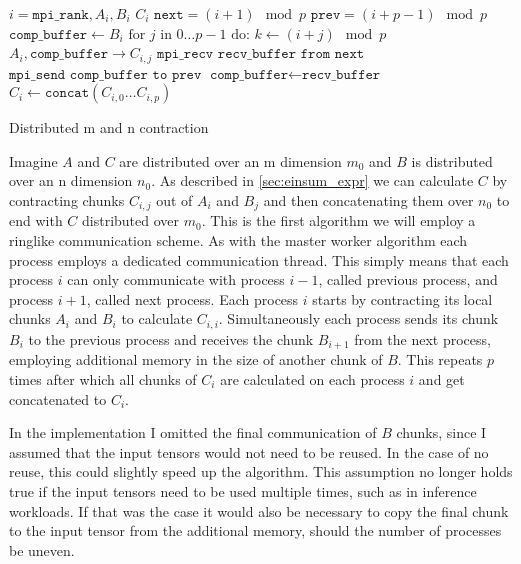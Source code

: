 \begin{algorithm}[ht]
        \begin{algorithmic}
        \Require $i = \texttt{mpi\_rank}, A_i, B_i$
        \Ensure $C_i$
        \State $\texttt{next} = (i+1) \mod p$
        \State $\texttt{prev} = (i+p-1) \mod p$
        \State $\texttt{comp\_buffer} \gets B_i$
        \State  $\text{for } j \text{ in } 0\dots p - 1 \text{ do:}$
        \State \indent $k \gets (i + j) \mod p$
        \State \indent {}
        \State \indent \indent $A_i, \texttt{comp\_buffer} \rightarrow C_{i,j}$
        \State \indent \indent $\texttt{mpi\_recv recv\_buffer from next}$
        \State \indent \indent $\texttt{mpi\_send comp\_buffer to prev}$
        \State \indent $\texttt{comp\_buffer} \gets \texttt{recv\_buffer}$
        \State $C_i \gets \texttt{concat}(C_{i,0}\dots C_{i,p})$
    \end{algorithmic}
    \caption{Distributed m and n contraction}
    \label{alg:m_n_pseudocode}
\end{algorithm}

Imagine $A$ and $C$ are distributed over an m dimension $m_0$ and $B$ is distributed over an n dimension $n_0$.
As described in \ref{sec:einsum_expr} we can calculate $C$ by contracting chunks $C_{i,j}$ out of $A_i$ and $B_j$ and then concatenating them over $n_0$ to end with $C$ distributed over $m_0$.
This is the first algorithm we will employ a ringlike communication scheme.
As with the master worker algorithm each process employs a dedicated communication thread.
This simply means that each process $i$ can only communicate with process $i-1$, called previous process, and process $i+1$, called next process.
Each process $i$ starts by contracting its local chunks $A_i$ and $B_i$ to calculate $C_{i,i}$.
Simultaneously each process sends its chunk $B_i$ to the previous process and receives the chunk $B_{i+1}$ from the next process, employing additional memory in the size of another chunk of $B$.
This repeats $p$ times after which all chunks of $C_{i}$ are calculated on each process $i$ and get concatenated to $C_i$.

In the implementation I omitted the final communication of $B$ chunks, since I assumed that the input tensors would not need to be reused.
In the case of no reuse, this could slightly speed up the algorithm.
This assumption no longer holds true if the input tensors need to be used multiple times, such as in inference workloads.
If that was the case it would also be necessary to copy the final chunk to the input tensor from the additional memory, should the number of processes be uneven.

